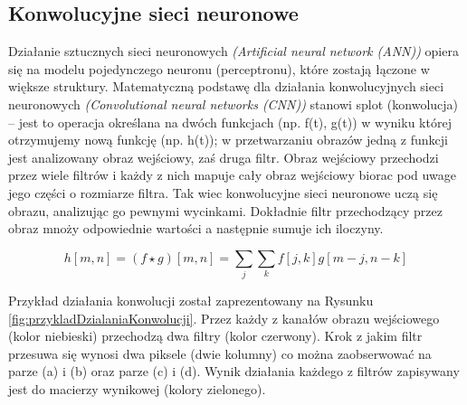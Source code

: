 \documentclass[a4paper,12pt]{article}
\newcommand\spacingIndent{2.2em}
\begin{document}
    \subsection{Konwolucyjne sieci neuronowe}
        \hspace{\spacingIndent} Działanie sztucznych sieci neuronowych \textit{(Artificial neural network (ANN))} opiera się na modelu pojedynczego     
			neuronu (perceptronu), które zostają łączone w większe struktury. Matematyczną podstawę dla działania konwolucyjnych sieci neuronowych 
			\textit{(Convolutional neural networks (CNN))} stanowi splot (konwolucja) -- jest to operacja określana na dwóch funkcjach (np. f(t), g(t)) 
			w wyniku której otrzymujemy nową funkcję (np. h(t)); w przetwarzaniu obrazów jedną z funkcji jest analizowany obraz wejściowy, zaś druga filtr.
            Obraz wejściowy przechodzi przez wiele filtrów i każdy z nich mapuje cały obraz wejściowy biorac pod uwage jego części o rozmiarze filtra. 
			Tak wiec konwolucyjne sieci neuronowe uczą się obrazu, analizując go pewnymi wycinkami. Dokładnie filtr przechodzący przez obraz 
			mnoży odpowiednie wartości a następnie sumuje ich iloczyny.
			
			
        
            \begin{displaymath}
                h[m, n] = ( f \star g)[m, n] = \sum\limits_{j}\sum\limits_{k}f[j, k]g[m-j, n-k]
            \end{displaymath}
            
            Przykład działania konwolucji został zaprezentowany na Rysunku \ref{fig:przykladDzialaniaKonwolucji}. 
            Przez każdy z kanałów obrazu wejściowego (kolor niebieski) przechodzą dwa filtry (kolor czerwony). Krok z jakim filtr przesuwa się wynosi dwa piksele (dwie kolumny) co można zaobserwować na parze (a) i (b) oraz parze (c) i (d). Wynik działania każdego z filtrów zapisywany jest do macierzy wynikowej (kolory zielonego). 
            
            
		    \newpage
		    
\end{document}
